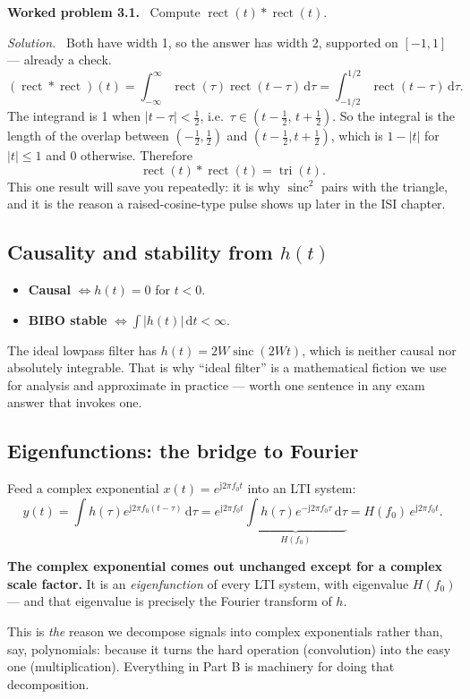 \documentclass[11pt,a4paper]{article}
\newcommand{\sinc}{\operatorname{sinc}}
\newcommand{\rect}{\operatorname{rect}}
\newcommand{\tri}{\operatorname{tri}}
\newcommand{\dd}{\,\mathrm{d}}
\newcommand{\ii}{\mathrm{j}}
\newenvironment{worked}[1]{\par\vspace{4pt}\noindent\textbf{\color{warmred}Worked problem #1.}\ \ignorespaces}{\par\vspace{4pt}}
\newcommand{\soln}{\par\vspace{2pt}\noindent\textit{Solution.}\ \ignorespaces}
\begin{document}
\begin{worked}{3.1}
Compute $\rect(t)*\rect(t)$.
\end{worked}
\soln
Both have width 1, so the answer has width 2, supported on $[-1,1]$ --- already a check.
\[
(\rect*\rect)(t)=\int_{-\infty}^{\infty}\rect(\tau)\rect(t-\tau)\dd\tau
=\int_{-1/2}^{1/2}\rect(t-\tau)\dd\tau .
\]
The integrand is 1 when $|t-\tau|<\tfrac12$, i.e.\ $\tau\in(t-\tfrac12,\,t+\tfrac12)$. So the integral is the
length of the overlap between $(-\tfrac12,\tfrac12)$ and $(t-\tfrac12,t+\tfrac12)$, which is $1-|t|$ for
$|t|\le1$ and 0 otherwise. Therefore
\[
\rect(t)*\rect(t)=\tri(t).
\]
This one result will save you repeatedly: it is why $\sinc^2$ pairs with the triangle, and it is the reason a
raised-cosine-type pulse shows up later in the ISI chapter.

\subsection{Causality and stability from $h(t)$}
\begin{itemize}[nosep,leftmargin=*]
\item \textbf{Causal} $\iff h(t)=0$ for $t<0$.
\item \textbf{BIBO stable} $\iff \int|h(t)|\dd t<\infty$.
\end{itemize}
The ideal lowpass filter has $h(t)=2W\sinc(2Wt)$, which is neither causal nor absolutely integrable. That is
why ``ideal filter'' is a mathematical fiction we use for analysis and approximate in practice --- worth one
sentence in any exam answer that invokes one.

\subsection{Eigenfunctions: the bridge to Fourier}
Feed a complex exponential $x(t)=e^{\ii 2\pi f_0 t}$ into an LTI system:
\[
y(t)=\int h(\tau)e^{\ii2\pi f_0 (t-\tau)}\dd\tau
= e^{\ii2\pi f_0 t}\underbrace{\int h(\tau)e^{-\ii2\pi f_0\tau}\dd\tau}_{\textstyle H(f_0)} = H(f_0)\,e^{\ii2\pi f_0t}.
\]
\begin{keybox}
\textbf{The complex exponential comes out unchanged except for a complex scale factor.} It is an
\emph{eigenfunction} of every LTI system, with eigenvalue $H(f_0)$ --- and that eigenvalue is precisely the
Fourier transform of $h$.

This is \emph{the} reason we decompose signals into complex exponentials rather than, say, polynomials:
because it turns the hard operation (convolution) into the easy one (multiplication). Everything in Part B is
machinery for doing that decomposition.
\end{keybox}
\end{document}
